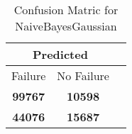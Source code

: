 \begin{table}[] 
\caption{Confusion Matric for NaiveBayesGaussian} 
\label{Table: Prediction Accuracy-NoneNaiveBayesGaussianOnlySunEKF-ignoreReflection-Reflection} 
\centering 
\begin{tabular} 
 {@{}ccc@{}} 
\toprule 
\multicolumn{2}{c}{\textbf{Predicted}}
 \\ \midrule 
\multicolumn{1}{|c|}{Failure} & 
\multicolumn{1}{c|}{No Failure}
 \\ \midrule 
\multicolumn{1}{|c|}{\color{green}\textbf{99767}} & 
\multicolumn{1}{c|}{\color{red}\textbf{10598}}
 \\ \midrule 
\multicolumn{1}{|c|}{\color{red}\textbf{44076}} & 
\multicolumn{1}{c|}{\color{green}\textbf{15687}}
 \\ \bottomrule 
\end{tabular} 
\end{table} 
